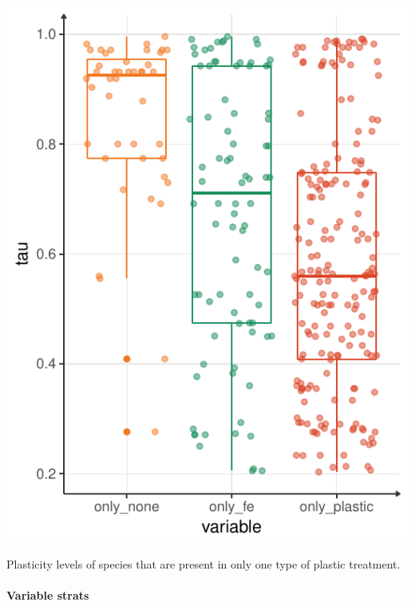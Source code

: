 \begin{marginfigure}\label{fig:tau}
\includegraphics[]{./2_PP/Figures/Comm/comm_tau_differences_exclusive_groups.pdf}
\caption[Plasticity levels in exclusive groups]{Plasticity levels of species that are present in only one type of plastic treatment.}
\end{marginfigure}



\paragraph{Variable strats}

